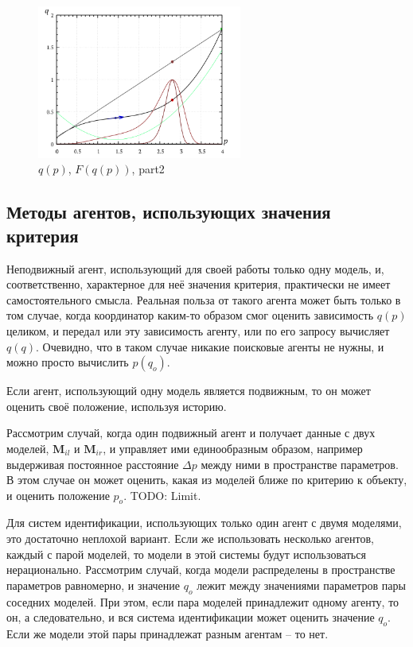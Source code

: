 \begin{figure}[htb!]
  \centerline{\includegraphics[width=0.6\textwidth]{pq_2x8.png} }
  \caption{$q(p)$, $F(q(p))$, part2 }
  \label{atu:pq_2x8}
\end{figure}



\subsection{Методы агентов, использующих значения критерия }  %

Неподвижный агент, использующий для своей работы только одну модель,
и, соответственно, характерное для неё значения критерия,
практически не имеет самостоятельного смысла. Реальная польза от такого агента
может быть только в том случае, когда координатор
каким-то образом смог оценить зависимость $q(p)$ целиком,
и передал или эту зависимость агенту, или по его запросу вычисляет $q(q)$.
Очевидно, что в таком случае никакие поисковые агенты не нужны,
и можно просто вычислить $p(q_o)$.

Если агент, использующий одну модель является подвижным,
то он может оценить своё положение, используя историю.

Рассмотрим случай, когда один подвижный агент и получает данные с двух моделей,
$ \mathbf{M}_{il}$ и
$ \mathbf{M}_{ir}$,
и управляет ими единообразным образом, например
выдерживая постоянное расстояние $\Delta p$ между ними в пространстве параметров.
В этом случае он может оценить, какая из моделей ближе по критерию
к объекту, и оценить положение $p_o$. TODO: Limit.

Для систем идентификации, использующих только один агент с двумя моделями,
это достаточно неплохой вариант.
Если же использовать несколько агентов, каждый с парой моделей,
то модели в этой системы будут использоваться нерационально.
Рассмотрим случай, когда модели распределены в пространстве
параметров равномерно, и значение $q_o$ лежит между значениями
параметров пары соседних моделей.
При этом, если пара моделей принадлежит одному агенту, то он,
а следовательно, и вся система идентификации может
оценить значение $q_o$. Если же модели этой пары
принадлежат разным агентам -- то нет.

